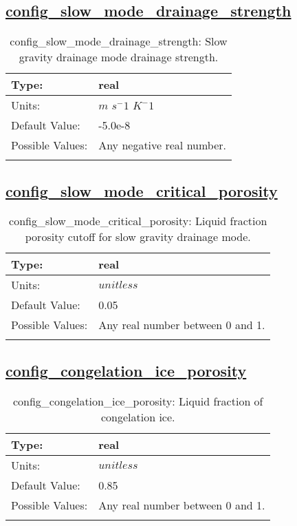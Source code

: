 \subsection[config\_slow\_mode\_drainage\_strength]{\hyperref[sec:nm_tab_thermodynamics]{config\_slow\_mode\_drainage\_strength}}
\label{subsec:nm_sec_config_slow_mode_drainage_strength}
\begin{center}
\begin{longtable}{| p{2.0in} || p{4.0in} |}
    \hline
    Type: & real \\
    \hline
    Units: & $m$ $s^-1$ $K^-1$ \\
    \hline
    Default Value: & -5.0e-8 \\
    \hline
    Possible Values: & Any negative real number. \\
    \hline
    \caption{config\_slow\_mode\_drainage\_strength: Slow gravity drainage mode drainage strength.}
\end{longtable}
\end{center}
\subsection[config\_slow\_mode\_critical\_porosity]{\hyperref[sec:nm_tab_thermodynamics]{config\_slow\_mode\_critical\_porosity}}
\label{subsec:nm_sec_config_slow_mode_critical_porosity}
\begin{center}
\begin{longtable}{| p{2.0in} || p{4.0in} |}
    \hline
    Type: & real \\
    \hline
    Units: & $unitless$ \\
    \hline
    Default Value: & 0.05 \\
    \hline
    Possible Values: & Any real number between 0 and 1. \\
    \hline
    \caption{config\_slow\_mode\_critical\_porosity: Liquid fraction porosity cutoff for slow gravity drainage mode.}
\end{longtable}
\end{center}
\subsection[config\_congelation\_ice\_porosity]{\hyperref[sec:nm_tab_thermodynamics]{config\_congelation\_ice\_porosity}}
\label{subsec:nm_sec_config_congelation_ice_porosity}
\begin{center}
\begin{longtable}{| p{2.0in} || p{4.0in} |}
    \hline
    Type: & real \\
    \hline
    Units: & $unitless$ \\
    \hline
    Default Value: & 0.85 \\
    \hline
    Possible Values: & Any real number between 0 and 1. \\
    \hline
    \caption{config\_congelation\_ice\_porosity: Liquid fraction of congelation ice.}
\end{longtable}
\end{center}
